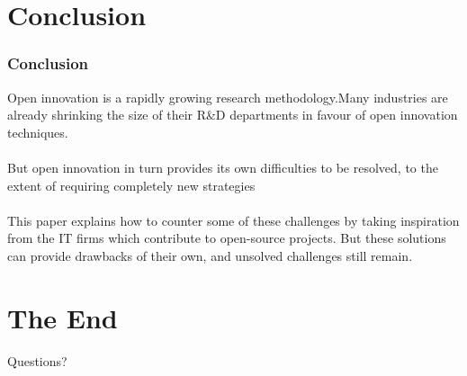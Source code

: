 \documentclass{beamer}
\begin{document}
\section{Conclusion}

\begin{frame}
\frametitle{Conclusion}
Open innovation is a rapidly growing research methodology.Many industries are already shrinking the size of their R\&D departments in favour of open innovation techniques.\\~\\

But open innovation in turn provides its own difficulties to be resolved, to the extent of requiring completely new strategies \\~\\

This paper explains how to counter some of these challenges by taking inspiration from the IT firms which contribute to open-source projects. But these solutions can provide drawbacks of their own, and unsolved challenges still remain.
\end{frame}

\section{The End}

\begin{frame}
\Huge{\centerline{Questions?}}
\end{frame}

\end{document}

